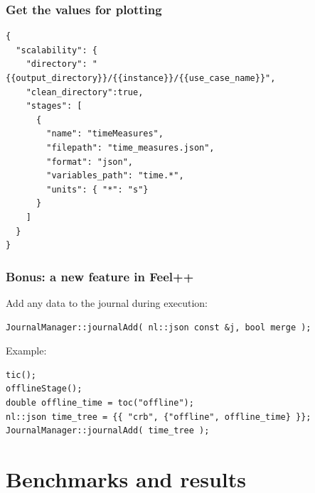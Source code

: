 \documentclass[aspectratio=169]{beamer}
\begin{document}
\begin{frame}[fragile]
  \frametitle{Get the values for plotting}

  \begin{lrbox}{\mintedbox}
  \begin{verbatim}
{
  "scalability": {
    "directory": "{{output_directory}}/{{instance}}/{{use_case_name}}",
    "clean_directory":true,
    "stages": [
      {
        "name": "timeMeasures",
        "filepath": "time_measures.json",
        "format": "json",
        "variables_path": "time.*",
        "units": { "*": "s"}
      }
    ]
  }
}
  \end{verbatim}
  \end{lrbox}

  \resizebox{\textwidth}{!}{\usebox{\mintedbox}}

\end{frame}

\begin{frame}[fragile]
  \frametitle{Bonus: a new feature in Feel++}

  Add any data to the journal during execution:

  \begin{verbatim}
JournalManager::journalAdd( nl::json const &j, bool merge );
  \end{verbatim}

  Example:

  \begin{verbatim}
tic();
offlineStage();
double offline_time = toc("offline");
nl::json time_tree = {{ "crb", {"offline", offline_time} }};
JournalManager::journalAdd( time_tree );
  \end{verbatim}



\end{frame}

\section{Benchmarks and results}
\end{document}
